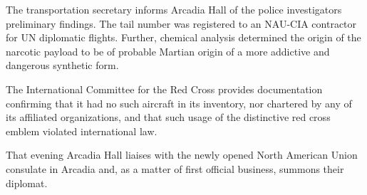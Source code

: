 The transportation secretary informs Arcadia Hall of the police investigators preliminary findings. The tail number was registered to an NAU-CIA contractor for UN diplomatic flights. Further, chemical analysis determined the origin of the narcotic payload to be of probable Martian origin of a more addictive and dangerous synthetic form.

The International Committee for the Red Cross provides documentation confirming that it had no such aircraft in its inventory, nor chartered by any of its affiliated organizations, and that such usage of the distinctive red cross emblem violated international law.

That evening Arcadia Hall liaises with the newly opened North American Union consulate in Arcadia and, as a matter of first official business, summons their diplomat.
\StopTimelineDate

